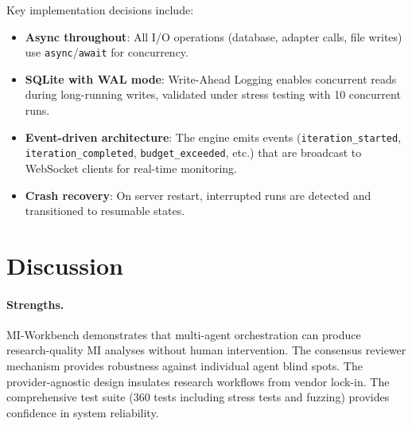 \documentclass[11pt,a4paper]{article}
\begin{document}
Key implementation decisions include:
\begin{itemize}[leftmargin=*]
  \item \textbf{Async throughout}: All I/O operations (database, adapter calls, file writes) use \texttt{async}/\texttt{await} for concurrency.
  \item \textbf{SQLite with WAL mode}: Write-Ahead Logging enables concurrent reads during long-running writes, validated under stress testing with 10 concurrent runs.
  \item \textbf{Event-driven architecture}: The engine emits events (\texttt{iteration\_started}, \texttt{iteration\_completed}, \texttt{budget\_exceeded}, etc.) that are broadcast to WebSocket clients for real-time monitoring.
  \item \textbf{Crash recovery}: On server restart, interrupted runs are detected and transitioned to resumable states.
\end{itemize}


\section{Discussion}
\label{sec:discussion}

\paragraph{Strengths.}
MI-Workbench demonstrates that multi-agent orchestration can produce research-quality MI analyses without human intervention.
The consensus reviewer mechanism provides robustness against individual agent blind spots.
The provider-agnostic design insulates research workflows from vendor lock-in.
The comprehensive test suite (360 tests including stress tests and fuzzing) provides confidence in system reliability.
\end{document}
